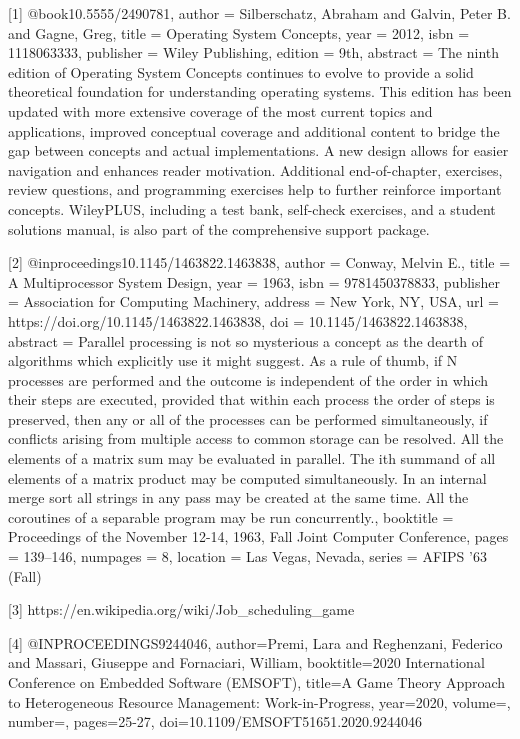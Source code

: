 [1] @book{10.5555/2490781,
author = {Silberschatz, Abraham and Galvin, Peter B. and Gagne, Greg},
title = {Operating System Concepts},
year = {2012},
isbn = {1118063333},
publisher = {Wiley Publishing},
edition = {9th},
abstract = {The ninth edition of Operating System Concepts continues to evolve to provide a solid theoretical foundation for understanding operating systems. This edition has been updated with more extensive coverage of the most current topics and applications, improved conceptual coverage and additional content to bridge the gap between concepts and actual implementations. A new design allows for easier navigation and enhances reader motivation. Additional end-of-chapter, exercises, review questions, and programming exercises help to further reinforce important concepts. WileyPLUS, including a test bank, self-check exercises, and a student solutions manual, is also part of the comprehensive support package.}
}

[2] @inproceedings{10.1145/1463822.1463838,
author = {Conway, Melvin E.},
title = {A Multiprocessor System Design},
year = {1963},
isbn = {9781450378833},
publisher = {Association for Computing Machinery},
address = {New York, NY, USA},
url = {https://doi.org/10.1145/1463822.1463838},
doi = {10.1145/1463822.1463838},
abstract = {Parallel processing is not so mysterious a concept as the dearth of algorithms which explicitly use it might suggest. As a rule of thumb, if N processes are performed and the outcome is independent of the order in which their steps are executed, provided that within each process the order of steps is preserved, then any or all of the processes can be performed simultaneously, if conflicts arising from multiple access to common storage can be resolved. All the elements of a matrix sum may be evaluated in parallel. The ith summand of all elements of a matrix product may be computed simultaneously. In an internal merge sort all strings in any pass may be created at the same time. All the coroutines of a separable program may be run concurrently.},
booktitle = {Proceedings of the November 12-14, 1963, Fall Joint Computer Conference},
pages = {139–146},
numpages = {8},
location = {Las Vegas, Nevada},
series = {AFIPS '63 (Fall)}
}

[3] https://en.wikipedia.org/wiki/Job_scheduling_game

[4] @INPROCEEDINGS{9244046,
  author={Premi, Lara and Reghenzani, Federico and Massari, Giuseppe and Fornaciari, William},
  booktitle={2020 International Conference on Embedded Software (EMSOFT)}, 
  title={A Game Theory Approach to Heterogeneous Resource Management: Work-in-Progress}, 
  year={2020},
  volume={},
  number={},
  pages={25-27},
  doi={10.1109/EMSOFT51651.2020.9244046}}
